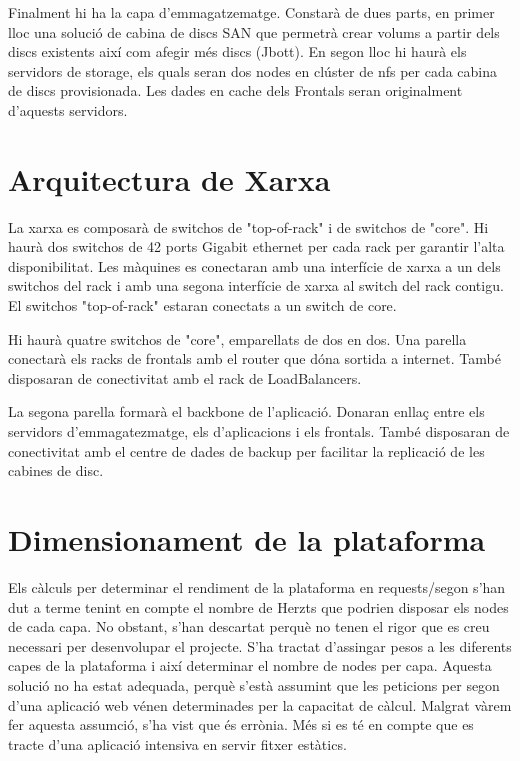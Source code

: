 \documentclass[a4paper, 11pt]{article}
\begin{document}
Finalment hi ha la capa d'emmagatzematge. Constarà de dues parts, en primer lloc una solució de cabina de discs SAN que permetrà crear volums a partir dels discs existents així com afegir més discs (Jbott). En segon lloc hi haurà els servidors de storage, els quals seran dos nodes en clúster de nfs per cada cabina de discs provisionada. Les dades en cache dels Frontals seran originalment d'aquests servidors.


\section{Arquitectura de Xarxa}

La xarxa es composarà de switchos de "top-of-rack" i de switchos de "core". Hi haurà dos switchos de 42 ports Gigabit ethernet per cada rack per garantir l'alta disponibilitat. Les màquines es conectaran amb una interfície de xarxa a un dels switchos del rack i amb una segona interfície de xarxa al switch del rack contigu. El switchos "top-of-rack" estaran conectats a un switch de core. 

Hi haurà quatre switchos de "core", emparellats de dos en dos. Una parella conectarà els racks de frontals amb el router que dóna sortida a internet. També disposaran de conectivitat amb el rack de LoadBalancers. 

La segona parella formarà el backbone de l'aplicació. Donaran enllaç entre els servidors d'emmagatezmatge, els d'aplicacions i els frontals. També disposaran de conectivitat amb el centre de dades de backup per facilitar la replicació de les cabines de disc. 


\section{Dimensionament de la plataforma}

Els càlculs per determinar el rendiment de la plataforma en requests/segon s'han dut a terme tenint en compte el nombre de Herzts que podrien disposar els nodes de cada capa. No obstant, s'han descartat perquè no tenen el rigor que es creu necessari per desenvolupar el projecte. 
S'ha tractat d'assingar pesos a les diferents capes de la plataforma i així determinar el nombre de nodes per capa. Aquesta solució no ha estat adequada, perquè s'està assumint que les peticions per segon d'una aplicació web vénen determinades per la capacitat de càlcul. Malgrat vàrem fer aquesta assumció, s'ha vist que és errònia. Més si es té en compte que es tracte d'una aplicació intensiva en servir fitxer estàtics.
\end{document}

